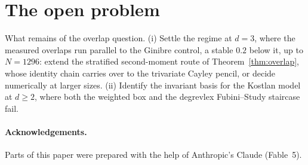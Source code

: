 \section{The open problem}\label{sec:open}

\begin{problem}\label{prob:open}
  What remains of the overlap question. (i) Settle the regime at $d=3$, where the
  measured overlaps run parallel to the Ginibre control, a stable $0.2$ below it, up to
  $N=1296$: extend the stratified second-moment route of Theorem~\ref{thm:overlap},
  whose identity chain carries over to the trivariate Cayley pencil, or decide
  numerically at larger sizes. (ii) Identify the invariant basis for the Kostlan model
  at $d\ge2$, where both the weighted box and the degrevlex Fubini--Study staircase
  fail.
\end{problem}

\paragraph{Acknowledgements.}
Parts of this paper were prepared with the help of Anthropic's Claude (Fable~5).

